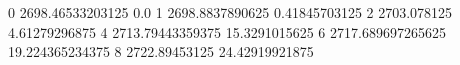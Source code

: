 0 2698.46533203125 0.0
1 2698.8837890625 0.41845703125
2 2703.078125 4.61279296875
4 2713.79443359375 15.3291015625
6 2717.689697265625 19.224365234375
8 2722.89453125 24.42919921875
